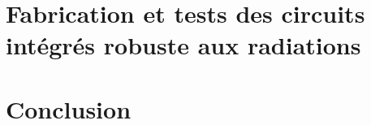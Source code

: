 \documentclass[12pt,a4paper]{report}
\begin{document}
\chapter{Fabrication et tests des circuits intégrés robuste aux radiations}





\chapter{Conclusion}


% 
% 



\end{document}
